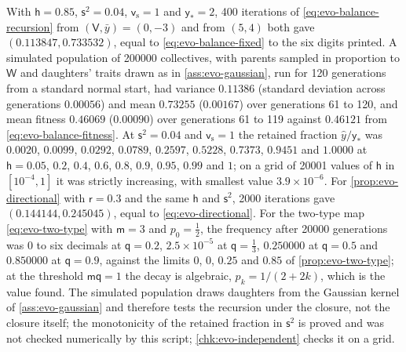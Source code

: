 \begin{numcheck}\label{chk:evo-balance}
With $\mathsf h=0.85$, $\mathsf s^2=0.04$, $\mathsf v_{\mathrm s}=1$ and $\mathsf y_\ast=2$, 400 iterations of \eqref{eq:evo-balance-recursion} from $(\mathsf V,\bar y)=(0,-3)$ and from $(5,4)$ both gave $(0.113847,0.733532)$, equal to \eqref{eq:evo-balance-fixed} to the six digits printed. A simulated population of 200000 collectives, with parents sampled in proportion to $\mathsf W$ and daughters' traits drawn as in \cref{ass:evo-gaussian}, run for 120 generations from a standard normal start, had variance $0.11386$ (standard deviation across generations $0.00056$) and mean $0.73255$ ($0.00167$) over generations 61 to 120, and mean fitness $0.46069$ ($0.00090$) over generations 61 to 119 against $0.46121$ from \eqref{eq:evo-balance-fitness}. At $\mathsf s^2=0.04$ and $\mathsf v_{\mathrm s}=1$ the retained fraction $\hat y/\mathsf y_\ast$ was $0.0020$, $0.0099$, $0.0292$, $0.0789$, $0.2597$, $0.5228$, $0.7373$, $0.9451$ and $1.0000$ at $\mathsf h=0.05$, $0.2$, $0.4$, $0.6$, $0.8$, $0.9$, $0.95$, $0.99$ and $1$; on a grid of 20001 values of $\mathsf h$ in $[10^{-4},1]$ it was strictly increasing, with smallest value $3.9\times10^{-6}$. For \cref{prop:evo-directional} with $\mathsf r=0.3$ and the same $\mathsf h$ and $\mathsf s^2$, 2000 iterations gave $(0.144144,0.245045)$, equal to \eqref{eq:evo-directional}. For the two-type map \eqref{eq:evo-two-type} with $\mathsf m=3$ and $p_0=\frac12$, the frequency after 20000 generations was $0$ to six decimals at $\mathsf q=0.2$, $2.5\times10^{-5}$ at $\mathsf q=\frac13$, $0.250000$ at $\mathsf q=0.5$ and $0.850000$ at $\mathsf q=0.9$, against the limits $0$, $0$, $0.25$ and $0.85$ of \cref{prop:evo-two-type}; at the threshold $\mathsf m\mathsf q=1$ the decay is algebraic, $p_k=1/(2+2k)$, which is the value found. The simulated population draws daughters from the Gaussian kernel of \cref{ass:evo-gaussian} and therefore tests the recursion under the closure, not the closure itself; the monotonicity of the retained fraction in $\mathsf s^2$ is proved and was not checked numerically by this script; \cref{chk:evo-independent} checks it on a grid.
\end{numcheck}

